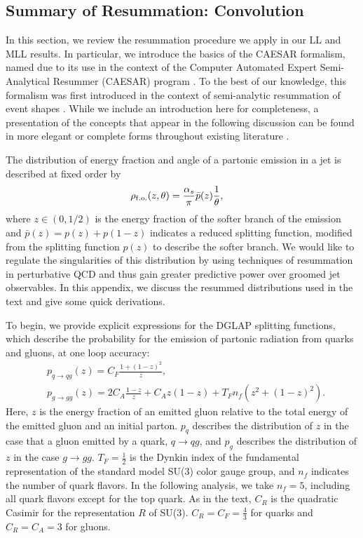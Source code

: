 \subsection{Summary of Resummation: Convolution}
\label{app:caesar_basics}
In this section, we review the resummation procedure we apply in our LL and MLL results.
%
In particular, we introduce the basics of the CAESAR formalism, named due to its use in the context of the Computer Automated Expert Semi-Analytical Resummer (CAESAR) program \cite{Banfi:2004yd}.
%
To the best of our knowledge, this formalism was first introduced in the context of semi-analytic resummation of event shapes \cite{Banfi:2001bz}.
%
While we include an introduction here for completeness, a presentation of the concepts that appear in the following discussion can be found in more elegant or complete forms throughout existing literature \cite{Larkoski:2017fip, Larkoski:2021aav, Cohen:2020afv, Banfi:2001bz, Banfi:2004yd, Banfi:2004nk, Banfi:2010xy, Luisoni:2015xha, Bauer:2018svx, Baron:2020xoi}.

The distribution of energy fraction and angle of a partonic emission in a jet is described at fixed order by
%
\begin{align}
    \rho_{\rm f.o.}(z,\theta)
    &=
    \frac{\alpha_s}{\pi} \bar{p}(z) \frac{1}{\theta}
    ,
\end{align}
where \(z\in(0, 1/2)\) is the energy fraction of the softer branch of the emission and \(\bar{p}(z) = p(z) + p(1-z)\) indicates a reduced splitting function, modified from the splitting function \(p(z)\) to describe the softer branch.
%
We would like to regulate the singularities of this distribution by using techniques of resummation in perturbative QCD and thus gain greater predictive power over groomed jet observables.
%
In this appendix, we discuss the resummed distributions used in the text and give some quick derivations.

To begin, we provide explicit expressions for the DGLAP splitting functions, which describe the probability for the emission of partonic radiation from quarks and gluons, at one loop accuracy:
%
\begin{align}
&p_{q\to q g}(z) = C_F \frac{1+(1-z)^2}{z},
\label{eqn:quark_splitting}
\\
&p_{g\to g g}(z) = 2C_A\frac{1-z}{z} + C_A z(1-z) + T_F n_f (z^2 + (1-z)^2).
\label{eqn:gluon_splitting}
\end{align}
%
Here, \(z\) is the energy fraction of an emitted gluon relative to the total energy of the emitted gluon and an initial parton.
%
\(p_q\) describes the distribution of \(z\) in the case that a gluon emitted by a quark, \(q \to q g\), and \(p_g\) describes the distribution of \(z\) in the case \(g \to gg\).
%
\(T_F = \frac{1}{2}\) is the Dynkin index of the fundamental representation of the standard model SU(3) color gauge group, and \(n_f\) indicates the number of quark flavors.
%
In the following analysis, we take \(n_f = 5\), including all quark flavors except for the top quark.
%
As in the text, \(C_R\) is the quadratic Casimir for the representation \(R\) of SU(3).
%
\(C_R = C_F = \frac{4}{3}\) for quarks and \(C_R = C_A = 3\) for gluons.


